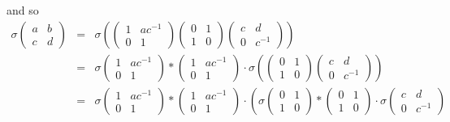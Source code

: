 and so
\begin{eqnarray*}
\sigma\left(\begin{matrix} a & b \\ c & d \end{matrix}\right) &=& 
\sigma\left(
\left(\begin{matrix} 1 & ac^{-1} \\ 0 & 1 \end{matrix}\right)
\left(\begin{matrix} 0 & 1 \\ 1 & 0 \end{matrix}\right)
\left(\begin{matrix} c & d \\ 0 & c^{-1} \end{matrix}\right)
\right) \\
&=&
\sigma \left(\begin{matrix} 1 & ac^{-1} \\ 0 & 1 \end{matrix}\right) *
\left(\begin{matrix} 1 & ac^{-1} \\ 0 & 1 \end{matrix}\right) \cdot
\sigma \left( 
\left(\begin{matrix} 0 & 1 \\ 1 & 0 \end{matrix}\right)
\left(\begin{matrix} c & d \\ 0 & c^{-1} \end{matrix}\right)
\right) \\
&=&
\sigma \left(\begin{matrix} 1 & ac^{-1} \\ 0 & 1 \end{matrix}\right) *
\left(\begin{matrix} 1 & ac^{-1} \\ 0 & 1 \end{matrix}\right) \cdot
\left( 
\sigma \left(\begin{matrix} 0 & 1 \\ 1 & 0 \end{matrix}\right) *
\left(\begin{matrix} 0 & 1 \\ 1 & 0 \end{matrix}\right) \cdot
\sigma\left(\begin{matrix} c & d \\ 0 & c^{-1} \end{matrix}\right)

\end{eqnarray*}
